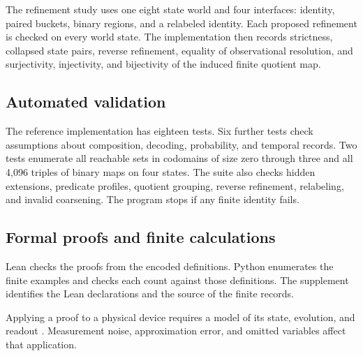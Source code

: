 The refinement study uses one eight state world and four interfaces: identity, paired buckets, binary regions, and a relabeled identity. Each proposed refinement is checked on every world state. The implementation then records strictness, collapsed state pairs, reverse refinement, equality of observational resolution, and surjectivity, injectivity, and bijectivity of the induced finite quotient map.

\subsection{Automated validation}

The reference implementation has eighteen tests. Six further tests check assumptions about composition, decoding, probability, and temporal records. Two tests enumerate all reachable sets in codomains of size zero through three and all 4,096 triples of binary maps on four states. The suite also checks hidden extensions, predicate profiles, quotient grouping, reverse refinement, relabeling, and invalid coarsening. The program stops if any finite identity fails.


\subsection{Formal proofs and finite calculations}

Lean checks the proofs from the encoded definitions. Python enumerates the finite examples and checks each count against those definitions. The supplement identifies the Lean declarations and the source of the finite records.

Applying a proof to a physical device requires a model of its state, evolution, and readout \parencite{Horsman2014,Horsman2015}. Measurement noise, approximation error, and omitted variables affect that application.

